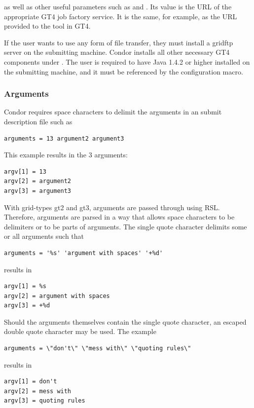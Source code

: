 as well as other useful parameters such as
 and .
Its value is the URL of the appropriate GT4 job factory service.
It is the same, for example,
as the URL provided to the  tool in GT4.

If the user wants to use any form of file transfer, they must install a
gridftp server on the submitting machine. Condor installs all other
necessary GT4 components under .
The user is required to
have Java 1.4.2 or higher installed on the submitting machine,
and it must be referenced by the 
 configuration macro.


\subsubsection{\label{sec:CondorG-Submit-Args}Arguments}

Condor requires space characters to delimit the arguments
in an submit description file such as
\begin{verbatim}
arguments = 13 argument2 argument3
\end{verbatim}
This example results in the 3 arguments:
\begin{verbatim}
argv[1] = 13
argv[2] = argument2
argv[3] = argument3
\end{verbatim}

With grid-types gt2 and gt3, arguments are passed through using RSL.
Therefore, arguments are parsed in a way that allows space characters
to be delimiters or to be parts of arguments.
The single quote character delimits some or all arguments such that
\begin{verbatim}
arguments = '%s' 'argument with spaces' '+%d'
\end{verbatim}
results in
\begin{verbatim}
argv[1] = %s
argv[2] = argument with spaces
argv[3] = +%d
\end{verbatim}

Should the arguments themselves contain the single quote character,
an escaped double quote character may be used.
The example
\footnotesize
\begin{verbatim}
arguments = \"don't\" \"mess with\" \"quoting rules\"
\end{verbatim}
\normalsize
results in 
\begin{verbatim}
argv[1] = don't
argv[2] = mess with
argv[3] = quoting rules
\end{verbatim}

